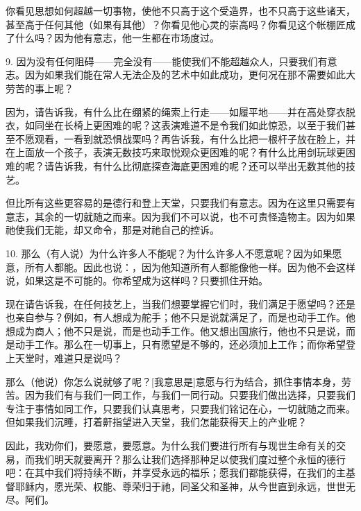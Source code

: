 你看见思想如何超越一切事物，使他不只高于这个受造界，也不只高于这些诸天，甚至高于任何其他（如果有其他）？你看见他心灵的崇高吗？你看见这个帐棚匠成了什么吗？因为他有意志，他一生都在市场度过。\par

9. 因为没有任何阻碍——完全没有——能使我们不能超越众人，只要我们有意志。因为如果我们能在常人无法企及的艺术中如此成功，更何况在那不需要如此大劳苦的事上呢？\par

因为，请告诉我，有什么比在绷紧的绳索上行走——如履平地——并在高处穿衣脱衣，如同坐在长椅上更困难的呢？这表演难道不是令我们如此惊恐，以至于我们甚至不愿观看，一看到就恐惧战栗吗？再告诉我，有什么比把一根杆子放在脸上，并在上面放一个孩子，表演无数技巧来取悦观众更困难的呢？有什么比用剑玩球更困难的呢？请告诉我，有什么比彻底探查海底更困难的呢？还可以举出无数其他的技艺。\par

但比所有这些更容易的是德行和登上天堂，只要我们有意志。因为在这里只需要有意志，其余的一切就随之而来。因为我们不可以说，也不可责怪造物主。因为如果祂使我们无能，却又命令，那是对祂自己的控诉。\par

10. 那么（有人说）为什么许多人不能呢？为什么许多人不愿意呢？因为如果愿意，所有人都能。因此也说：，因为他知道所有人都能像他一样。因为他不会这样说，如果这是不可能的。你希望成为这样吗？只要抓住开始。\par

现在请告诉我，在任何技艺上，当我们想要掌握它们时，我们满足于愿望吗？还是也亲自参与？例如，有人想成为舵手；他不只是说就满足了，而是也动手工作。他想成为商人；他不只是说，而是也动手工作。他又想出国旅行，他也不只是说，而是动手工作。那么在一切事上，只有愿望是不够的，还必须加上工作；而你希望登上天堂时，难道只是说吗？\par

那么（他说）你怎么说就够了呢？[我意思是]意愿与行为结合，抓住事情本身，劳苦。因为我们有与我们一同工作，与我们一同行动。只要我们做出选择，只要我们专注于事情如同工作，只要我们认真思考，只要我们铭记在心，一切就随之而来。但如果我们沉睡，打着鼾指望进入天堂，我们怎能获得天上的产业呢？\par

因此，我劝你们，要愿意，要愿意。为什么我们要进行所有与现世生命有关的交易，而我们明天就要离开？那么让我们选择那种足以使我们度过整个永恒的德行吧：在其中我们将持续不断，并享受永远的福乐；愿我们都能获得，在我们的主基督耶稣内，愿光荣、权能、尊荣归于祂，同圣父和圣神，从今世直到永远，世世无尽。阿们。\par

